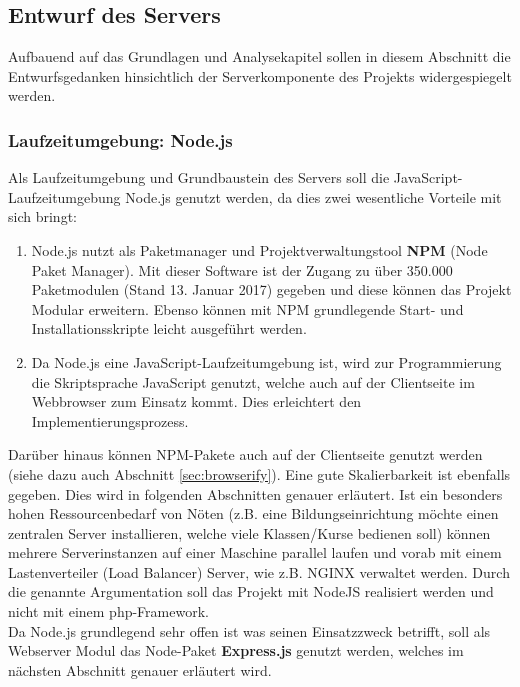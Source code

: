 \subsection{Entwurf des Servers}\label{sec:serverkonzept}
Aufbauend auf das Grundlagen und Analysekapitel sollen in diesem Abschnitt die Entwurfsgedanken hinsichtlich der Serverkomponente des Projekts widergespiegelt werden. 
\subsubsection{Laufzeitumgebung: Node.js}\label{sec:nodejs}
Als Laufzeitumgebung und Grundbaustein des Servers soll die JavaScript-Laufzeitumgebung Node.js genutzt werden, da dies zwei wesentliche Vorteile mit sich bringt:
\begin{enumerate}
	\item Node.js nutzt als Paketmanager und Projektverwaltungstool \textbf{NPM} (Node Paket Manager). Mit dieser Software ist der Zugang zu über 350.000 Paketmodulen (Stand 13. Januar 2017) gegeben und diese können das Projekt Modular erweitern. Ebenso können mit NPM grundlegende Start- und Installationsskripte leicht ausgeführt werden. 
	\item Da Node.js eine JavaScript-Laufzeitumgebung ist, wird zur Programmierung die Skriptsprache JavaScript genutzt, welche auch auf der Clientseite im Webbrowser zum Einsatz kommt. Dies erleichtert den Implementierungsprozess.  
\end{enumerate}
Darüber hinaus können NPM-Pakete auch auf der Clientseite genutzt werden (siehe dazu auch Abschnitt \ref{sec:browserify}). Eine gute Skalierbarkeit ist ebenfalls gegeben. Dies wird in folgenden Abschnitten genauer erläutert. Ist ein besonders hohen Ressourcenbedarf von Nöten (z.B. eine Bildungseinrichtung möchte einen zentralen Server installieren, welche viele Klassen/Kurse bedienen soll) können mehrere Serverinstanzen auf einer Maschine parallel laufen und vorab mit einem Lastenverteiler (Load Balancer) Server, wie z.B. NGINX verwaltet werden. Durch die genannte Argumentation soll das Projekt mit NodeJS realisiert werden und nicht mit einem php-Framework. \\ Da Node.js grundlegend sehr offen ist was seinen Einsatzzweck betrifft, soll als Webserver Modul das Node-Paket \textbf{Express.js} genutzt werden, welches im nächsten Abschnitt genauer erläutert wird.
